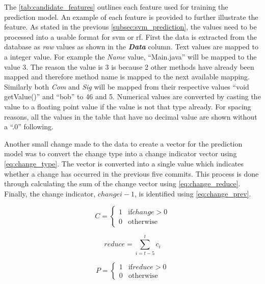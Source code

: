 The \autoref{tab:candidate_features} outlines each feature used for training the prediction model. An example of each feature is provided to further illustrate the feature. As stated in the previous \autoref{subsec:svm_prediction}, the values need to be processed into a usable format for \gls{svm} or \gls{rf}. First the data is extracted from the database as \textit{raw} values as shown in the \textit{\textbf{Data}} column. Text values are mapped to a integer value. For example the \textit{Name} value, ``Main.java'' will be mapped to the value 3. The reason the value is 3 is because 2 other methods have already been mapped and therefore method name is mapped to the next available mapping. Similarly both \textit{Com} and \textit{Sig} will be mapped from their respective values ``void getValue()'' and ``bob'' to 46 and 5. Numerical values are converted by casting the value to a floating point value if the value is not that type already. For spacing reasons, all the values in the table that have no decimal value are shown without a ``.0'' following.

Another small change made to the data to create a vector for the prediction model was to convert the change type into a change indicator vector using \autoref{eq:change_type}. The vector is converted into a single value which indicates whether a change has occurred in the previous five commits. This process is done through calculating the sum of the change vector using \autoref{eq:change_reduce}. Finally, the change indicator, $change{i-1}$, is identified using \autoref{eq:change_prev}.

\begin{equation} 
\label{eq:change_type}
C = \left\{\begin{matrix}
1 & \text{if} change > 0 \\
0 & \text{otherwise}
\end{matrix}\right.
\end{equation}

\begin{equation} 
\label{eq:change_reduce}
reduce = \sum_{i=t-5}^{t}{c_i}
\end{equation}

\begin{equation} 
\label{eq:change_prev}
P = \left\{\begin{matrix}
1 & \text{if} reduce > 0 \\
0 & \text{otherwise}
\end{matrix}\right.
\end{equation}

